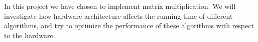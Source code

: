 In this project we have chosen to implement matrix multiplication. We
will investigate how hardware architecture affects the running time of
different algorithms, and try to optimize the performance of these
algorithms with respect to the hardware.
